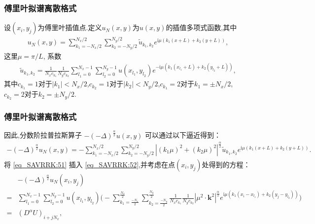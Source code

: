 \documentclass[aspectratio=169]{beamer}
\begin{document}
\begin{frame}\frametitle{傅里叶拟谱离散格式}
	设$\left(x_{i}, y_{j}\right)$为傅里叶插值点.定义$u_{N}(x, y)$为$u(x, y)$的插值多项式函数,其中
\begin{align}\label{eq_SAVRRK:50}
u_{N}(x, y)=\sum_{k_{1}=-N_{x} / 2}^{N_{x} / 2} \sum_{k_{2}=-N_{y} / 2}^{N_{y} / 2} \tilde{u}_{k_{1}, k_{2}} e^{\mathrm{i}\mu\left( k_{1} (x+L)+k_{2}(y+L)\right)},
\end{align}
这里$\mu={\pi}/{L}$, 系数
\begin{align}\label{eq_SAVRRK:51}
\tilde{u}_{k_{1}, k_{2}}=\frac{1}{N_{x} c_{k_{1}}} \frac{1}{N_{y} c_{k_{2}}} \sum_{l_1=0}^{N_{x}-1} \sum_{l_2=0}^{N_{y}-1} u(x_{l_1}, y_{l_2}) e^{-\mathrm{i}\mu\left( k_{1}(x_{l_1}+L)+k_{2}(y_{l_2}+L)\right)},
\end{align}
其中$c_{k_{1}}=1$对于$\left|k_{1}\right|<N_{x}/2$,$c_{k_{2}}=1$对于$\left|k_{2}\right|<N_{y}/2$,$c_{k_{1}}=2$对于$k_{1}=\pm N_{x}/2$,$c_{k_{2}}=2$对于$k_{2}=\pm N_{y}/2$.

\end{frame}

\begin{frame}\frametitle{傅里叶拟谱离散格式}
	
因此,分数阶拉普拉斯算子 $-(-\Delta)^{\frac{\alpha}{2}} u(x, y)$ 可以通过以下逼近得到：
\begin{align}\label{eq_SAVRRK:52}
-(-\Delta)^{\frac{\alpha}{2}} u_{N}\left(x, y\right)=-\sum\limits_{k_{1}=-N_{x} / 2}^{N_{x} / 2} \sum\limits_{k_{2}=-N_{y} / 2}^{N_{y} / 2}\left|\left(k_{1} \mu\right)^{2}+\left(k_{2} \mu\right)^{2}\right|^{\frac{\alpha}{2}} \tilde{u}_{k_{1}, k_{2}} e^{\mathrm{i}\mu\left( k_{1} (x+L)+k_{2}(y+L)\right)}.
\end{align}
将 \eqref{eq_SAVRRK:51} 插入 \eqref{eq_SAVRRK:52},并考虑在点$(x_i,y_j)$处得到的方程：
\begin{align}
&-(-\Delta)^{\frac{\alpha}{2}} u_{N}\left(x_{i}, y_{j}\right)\nonumber\\
=&\sum\limits_{l_{1}=0}^{N_{x}-1} \sum\limits_{l_{2}=0}^{N_{y}-1}u(x_{l_{1}}, y_{l_{2}})\Big(-\sum\limits_{k_{1}=\frac{-N_{x}}{2}}^{\frac{N_{x}}{2}} \sum\limits_{k_{2}=\frac{-N_{y}}{2}}^{\frac{N_{y}}{2}} \frac{1}{N_{x} c_{k_{1}}} \frac{1}{N_{y} c_{k_{2}}}\left|\mu^{2} \cdot \mathbf{k}^{2}\right|^{\frac{\alpha}{2}} e^{\mathrm{i} \mu\left(k_{1}\left(x_{i}-x_{l_{1}}\right)+k_{2}\left(y_{j}-y_{l_{2}}\right)\right)}\Big)\nonumber\\
=&\left(D^{\alpha}U\right)_{i+j N_{x}},\label{eq_SAVRRK:53}
\end{align}
\end{frame}
\end{document}
